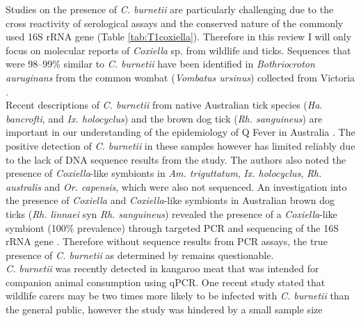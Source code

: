 \documentclass[a4paper, nobind]{templates/ociamthesis}
\begin{document}
Studies on the presence of \emph{C. burnetii} are particularly challenging due to the cross reactivity of serological assays and the conserved nature of the commonly used 16S rRNA gene (Table \ref{tab:T1coxiella}).
Therefore in this review I will only focus on molecular reports of \emph{Coxiella} sp. from wildlife and ticks.
Sequences that were 98--99\% similar to \emph{C. burnetii} have been identified in
\emph{Bothriocroton auruginans} from the common wombat (\emph{Vombatus ursinus}) collected from Victoria \autocite{vilcinsMolecularDetectionRickettsia2009,beardMorphologicalIdentificationTicks2021}.\\
Recent descriptions of \emph{C. burnetii} from native Australian tick species (\emph{Ha. bancrofti}, and \emph{Ix. holocyclus}) and the brown dog tick (\emph{Rh. sanguineus}) are important in our understanding of the epidemiology of Q Fever in Australia \autocite{chaladaMolecularSurveyTickBorne2018}.
The positive detection of \emph{C. burnetii} in these samples however has limited reliably due to the lack of DNA sequence results from the study.
The authors also noted the presence of \emph{Coxiella}-like symbionts in \emph{Am. triguttatum}, \emph{Ix. holocyclus}, \emph{Rh. australis} and \emph{Or. capensis}, which were also not sequenced.
An investigation into the presence of \emph{Coxiella} and \emph{Coxiella}-like symbionts in Australian brown dog ticks (\emph{Rh. linnaei} syn \emph{Rh. sanguineus}) revealed the presence of a \emph{Coxiella}-like symbiont (100\% prevalence) through targeted PCR and sequencing of the 16S rRNA gene \autocite{oskamMolecularInvestigationPresence2017}.
Therefore without sequence results from PCR assays, the true presence of \emph{C. burnetii} as determined by \textcite{chaladaMolecularSurveyTickBorne2018} remains questionable.\\
\emph{C. burnetii} was recently detected in kangaroo meat that was intended for companion animal consumption \autocite{shapiroMolecularDetectionCoxiella2020} using qPCR.
One recent study stated that wildlife carers may be two times more likely to be infected with \emph{C. burnetii} than the general public, however the study was hindered by a small sample size \autocite{mathewsCoxiellaBurnetiiSeroprevalence2021}
\end{document}
